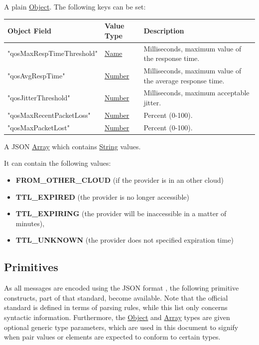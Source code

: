 \documentclass[a4paper]{arrowhead}
\newcommand{\pref}[1]{{\textcolor{ArrowheadGrey}{\hyperref[sec:model:primitives:#1]{#1}}}}
\begin{document}
A plain \pref{Object}. The following keys can be set:

\begin{table}[ht!]
\begin{tabularx}{\textwidth}{| p{5cm} | p{2cm} | X |} \hline
\rowcolor{gray!33} Object Field & Value Type                      & Description \\ \hline
"qosMaxRespTimeThreshold"         & \pref{Name}     & Milliseconds,  maximum value of the response time. \\ \hline
"qosAvgRespTime"            & \pref{Number}   & Milliseconds, maximum value of the average response time. \\ \hline
"qosJitterThreshold"               & \pref{Number}     &  Milliseconds, maximum acceptable jitter. \\ \hline
"qosMaxRecentPacketLoss" & \pref{Number}   & Percent (0-100). \\ \hline
"qosMaxPacketLost"       & \pref{Number} & Percent (0-100). \\ \hline

\end{tabularx}
\end{table}



A JSON \pref{Array} which contains \pref{String} values.

It can contain the following values:
\begin{itemize}
    \item \textbf{FROM\_OTHER\_CLOUD} (if the provider is in an other cloud)
    \item \textbf{TTL\_EXPIRED} (the provider is no longer accessible)
\item \textbf{TTL\_EXPIRING} (the provider will be inaccessible in a matter of minutes),
\item \textbf{TTL\_UNKNOWN} (the provider does not specified expiration time)
\end{itemize}

\subsection{Primitives}
\label{sec:model:primitives}

As all messages are encoded using the JSON format \cite{bray2014json}, the following primitive constructs, part of that standard, become available.
Note that the official standard is defined in terms of parsing rules, while this list only concerns syntactic information.
Furthermore, the \pref{Object} and \pref{Array} types are given optional generic type parameters, which are used in this document to signify when pair values or elements are expected to conform to certain types. 
\end{document}
